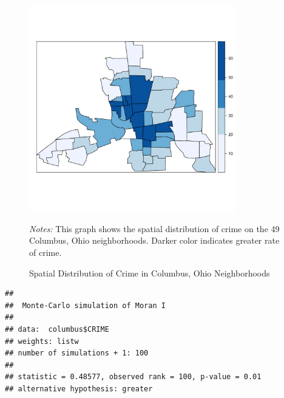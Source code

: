 \begin{figure}[ht]
\caption{Spatial Distribution of Crime in Columbus, Ohio Neighborhoods}
    \label{fig:spatial-crime}
    \centering 
	\begin{minipage}{.9\linewidth}
\begin{knitrout}
\color{fgcolor}

{\centering \includegraphics[width=9cm,height=9cm]{figure/spatial-crime-1} 

}


\end{knitrout}
\footnotesize
		\emph{Notes:} This graph shows the spatial distribution of crime on the 49 Columbus, Ohio neighborhoods. Darker color indicates greater rate of crime. 
	\end{minipage}	
\end{figure}


\begin{knitrout}
\color{fgcolor}\begin{kframe}
\begin{alltt}
\hlstd{(}\hlstd{)}
 \hlkwb{<-}   \hlstd{=} \hlstd{)}
\hlopt{$}  
            \hlstd{=} \hlstd{,}  \hlstd{=} \hlstd{)}
\end{alltt}
\begin{verbatim}
## 
## 	Monte-Carlo simulation of Moran I
## 
## data:  columbus$CRIME 
## weights: listw  
## number of simulations + 1: 100 
## 
## statistic = 0.48577, observed rank = 100, p-value = 0.01
## alternative hypothesis: greater
\end{verbatim}
\end{kframe}
\end{knitrout}

